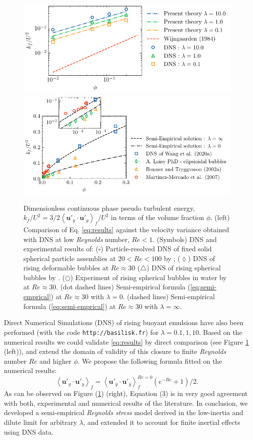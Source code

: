 \documentclass[12pt,a4paper]{article}
\newcommand{\avg}[1]{\left<#1\right>}
\renewcommand{\avg}[1]{\left<#1\right>}
\begin{document}
\begin{figure}[h!]
    \centering
    \includegraphics[height=0.20\textwidth]{image/HOMOGENEOUS_final/CA/kf_Ga_5.pdf}
    \includegraphics[height=0.25\textwidth]{image/HOMOGENEOUS_final/CA/KFliterature.pdf}
    \caption{\small
        Dimensionless continuous phase pseudo turbulent energy, $k_f/U^2 = 3/2\avg{\textbf{u}'_y\cdot\textbf{u}'_y}_f/ U^2$ in terms of the volume fraction $\phi$.    
        (left) Comparison of Eq. \eqref{eq:results} against the velocity variance obtained with DNS at low \textit{Reynolds} number, $Re < 1$. 
        (Symbols) DNS and experimental results of: 
        ($\pmb\square$)  Particle-resolved DNS
        of fixed solid spherical particle assemblies at $20< Re < 100$  by \cite{wang2021numerical}; 
        ($\pmb\lozenge$) DNS of rising deformable bubbles at $Re \approx 30$ \cite{loisy2016direct}
        ($\pmb\triangle$) DNS of rising spherical bubbles by \cite{bunner2002dynamics}. 
        ($\pmb\bigcirc$) Experiment of rising spherical bubbles in water by \cite{martinez2007measurement} at $Re \approx 30$. 
        (dot dashed lines) Semi-empirical formula (\ref{eq:semi-emprical}) at $Re \approx 30$ with $\lambda = 0$. 
        (dashed lines)  Semi-empirical formula (\ref{eq:semi-emprical}) at $Re \approx 30$ with $\lambda = \infty$.
            }
    \label{fig:wake}
\end{figure}

Direct Numerical Simulations (DNS) of rising buoyant emulsions have also been performed (with the code \texttt{http://basilisk.fr}) for $\lambda = 0.1,1,10$. 
Based on the numerical results we could validate \eqref{eq:results} by direct comparison (see Figure \ref{fig:wake} (left)), and extend the domain of validity of this closure to finite \textit{Reynolds} number $Re$ and higher $\phi$. 
We propose the following formula fitted on the numerical results: 
\begin{equation}
    \avg{\textbf{u}'_y\cdot \textbf{u}'_y}_f
    =
    \avg{\textbf{u}'_y\cdot \textbf{u}'_y}_f^{Re = 0}
    \left(e^{-Re} +1\right)/2. 
    \label{eq:semi-emprical}
\end{equation}
As can be observed on Figure (\ref{fig:wake}) (right), Equation (3) is in very good agreement with both, experimental and numerical results of the literature.  
In conclusion, we developed a semi-empirical \textit{Reynolds stress} model derived in the low-inertia and dilute limit for arbitrary $\lambda$, and extended it to account for finite inertial effects using DNS data.

 



\end{document}
